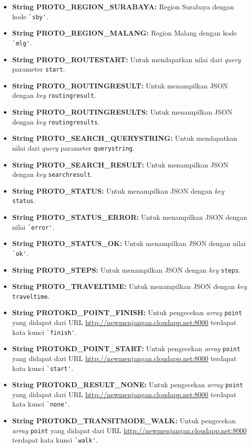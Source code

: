 \begin{enumerate}
\begin{itemize}
		\item \textbf{String PROTO\_REGION\_SURABAYA:} Region Surabaya dengan kode \verb!`sby'!.
		\item \textbf{String PROTO\_REGION\_MALANG:} Region Malang dengan kode \verb!`mlg'!.
		\item \textbf{String PROTO\_ROUTESTART:} Untuk mendapatkan nilai dari \textit{query} parameter \verb!start!.
		\item \textbf{String PROTO\_ROUTINGRESULT:} Untuk menampilkan JSON dengan \textit{key} \verb!routingresult!.
		\item \textbf{String PROTO\_ROUTINGRESULTS:} Untuk menampilkan JSON dengan \textit{key} \verb!routingresults!.
		\item \textbf{String PROTO\_SEARCH\_QUERYSTRING:} Untuk mendapatkan nilai dari \textit{query} parameter \verb!querystring!.
		\item \textbf{String PROTO\_SEARCH\_RESULT:} Untuk menampilkan JSON dengan \textit{key} \verb!searchresult!.
		\item \textbf{String PROTO\_STATUS:} Untuk menampilkan JSON dengan \textit{key} \verb!status!.
		\item \textbf{String PROTO\_STATUS\_ERROR:} Untuk menampilkan JSON dengan nilai \verb!`error'!.
		\item \textbf{String PROTO\_STATUS\_OK:} Untuk menampilkan JSON dengan nilai \verb!`ok'!.
		\item \textbf{String PROTO\_STEPS:} Untuk menampilkan JSON dengan \textit{key} \verb!steps!.
		\item \textbf{String PROTO\_TRAVELTIME:} Untuk menampilkan JSON dengan \textit{key} \verb!traveltime!.
		\item \textbf{String PROTOKD\_POINT\_FINISH:} Untuk pengecekan \textit{array} \verb!point! yang didapat dari URL \url{http://newmenjangan.cloudapp.net:8000} terdapat kata kunci \verb!`finish'!.
		\item \textbf{String PROTOKD\_POINT\_START:} Untuk pengecekan \textit{array} \verb!point! yang didapat dari URL \url{http://newmenjangan.cloudapp.net:8000} terdapat kata kunci \verb!`start'!.
		\item \textbf{String PROTOKD\_RESULT\_NONE:} Untuk pengecekan \textit{array} \verb!point! yang didapat dari URL \url{http://newmenjangan.cloudapp.net:8000} terdapat kata kunci \verb!`none'!.
		\item \textbf{String PROTOKD\_TRANSITMODE\_WALK:} Untuk pengecekan \textit{array} \verb!point! yang didapat dari URL \url{http://newmenjangan.cloudapp.net:8000} terdapat kata kunci \verb!`walk'!.
	\end{itemize}
	

\end{enumerate}
